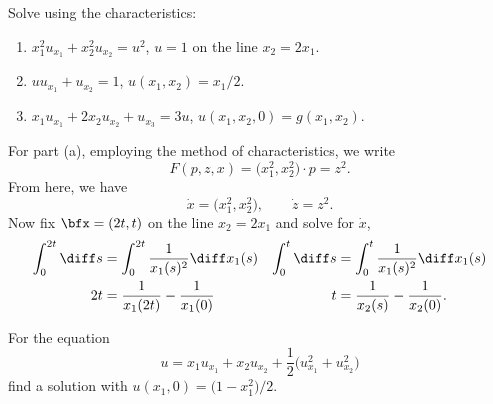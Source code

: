 \begin{problem}
  Solve using the characteristics:
  \begin{enumerate}[label=(\alph*)]
  \item \(x_1^2u_{x_1}+x_2^2u_{x_2}=u^2\), \(u=1\) on the line
    \(x_2=2x_1\).
  \item \(uu_{x_1}+u_{x_2}=1\), \(u(x_1,x_2)=x_1/2\).
  \item \(x_1u_{x_1}+2x_2u_{x_2}+u_{x_3}=3u\),
    \(u(x_1,x_2,0)=g(x_1,x_2)\).
  \end{enumerate}
\end{problem}
\begin{solution}
  For part (a), employing the method of characteristics, we write
  \[
    F(p,z,x)=\bigl(x_1^2,x_2^2\bigr)\cdot p=z^2.
  \]
  From here, we have
  \[
    \dot x=\bigl(x_1^2,x_2^2\bigr),\qquad
    \dot z= z^2.
  \]
  Now fix \(\bfx=(2t,t)\) on the line \(x_2=2x_1\) and solve for \(\dot
  x\),
  \begin{align*}
    \int_0^{2t}\diff s&=\int_0^{2t}\frac{1}{x_1(s)^2}\diff x_1(s)
    &\int_0^t\diff s&=\int_0^t\frac{1}{x_1(s)^2}\diff x_1(s)\\
    2t&=\frac{1}{x_1(2t)}-\frac{1}{x_1(0)}
    &t&=\frac{1}{x_2(s)}-\frac{1}{x_2(0)}.
  \end{align*}
\end{solution}
\newpage

\begin{problem}
  For the equation
  \[
    u=x_1u_{x_1}+x_2u_{x_2}
    +\frac{1}{2}\bigl(u_{x_1}^2+u_{x_2}^2\bigr)
  \]
  find a solution with \(u(x_1,0)=\bigl(1-x_1^2\bigr)/2\).
\end{problem}
\begin{solution}

\end{solution}

